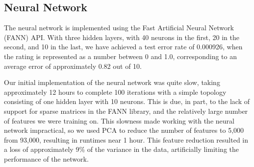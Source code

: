 \documentclass[journal]{IEEEtran}
\begin{document}
\subsection{Neural Network}
The neural network is implemented using the Fast Artificial Neural Network (FANN)
API.  With three hidden layers, with 40 neurons in the first, 20 in the second, and 10 in the last,
we have achieved a test error rate of 0.000926, when the rating is represented as a
number between 0 and 1.0, corresponding to an average error of approximately 0.82 out of 10.
\\
\par Our initial implementation of the neural network was quite slow, taking approximately
12 hours to complete 100 iterations with a simple topology consisting of one hidden
layer with 10 neurons.  This is due, in part, to the lack of support for sparse matrices in the FANN library, and the relatively large number of features we were training on.  This slowness made working with the neural network impractical, so we used PCA to reduce the number of features to 5,000 from 93,000, resulting in runtimes near 1 hour.  This feature reduction resulted in a loss of approximately 9\% of the variance in the data, artificially limiting the performance of the network.  \\
\end{document}
